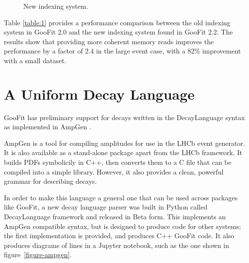 \documentclass{webofc}
\begin{document}
\begin{figure}
	\label{figure-newindexspeed}
	\caption{New indexing system.}
\end{figure}

Table \ref{table:1} provides a performance comparison between the old indexing system in GooFit 2.0 and the new indexing system found in GooFit 2.2. The results show that providing more coherent memory reads improves the performance by a factor of 2.4 in the large event case, with a 82\% improvement with a small dataset.

\section{A Uniform Decay Language}
\label{sec-ampgen}

GooFit has preliminary support for decays written in the DecayLanguage syntax as implemented in AmpGen \cite{lib:AmpGen}.

AmpGen is a tool for compiling amplitudes for use in the LHCb event generator. It is also available as a stand-alone package apart from the LHCb framework. It builds PDFs symbolicily in C++, then converts them to a C file that can be compiled into a simple library. However, it also provides a clean, powerful grammar for describing decays.

In order to make this language a general one that can be used across packages like GooFit, a new decay language parser was built in Python called DecayLanguage framework and released in Beta form. This implements an AmpGen compatible syntax, but is designed to produce code for other systems; the first implementation is provided, and produces C++ GooFit code. It also produces diagrams of lines in a Jupyter notebook, such as the one shown in figure~\ref{figure-ampgen}.
\end{document}
